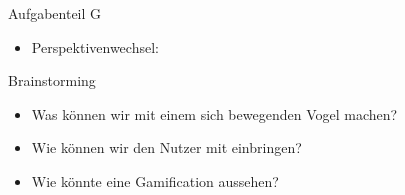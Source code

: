 \documentclass{beamer}
\begin{document}
\begin{frame}{Aufgabenteil G}
\begin{itemize}
\item Perspektivenwechsel:
\end{itemize}
\begin{figure}
    \centering
\end{figure}
\end{frame}

\begin{frame}{Brainstorming}
\begin{itemize}
\item Was können wir mit einem sich bewegenden Vogel machen?
\item Wie können wir den Nutzer mit einbringen?
\item Wie könnte eine Gamification aussehen?
\end{itemize}
\end{frame}
\end{document}
